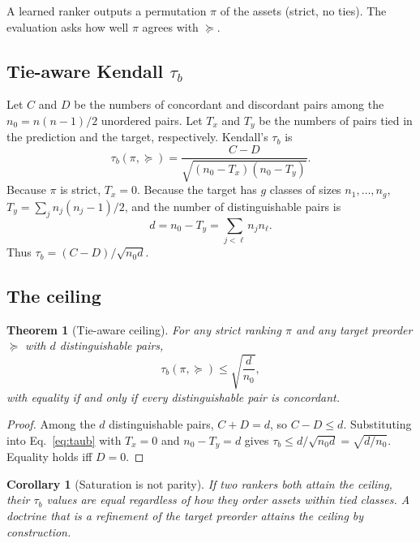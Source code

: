 \documentclass[conference,10pt]{IEEEtran}
\newtheorem{theorem}{Theorem}
\newtheorem{corollary}{Corollary}
\newcommand{\tb}{\tau_b}
\newcommand{\distinct}{d}
\newcommand{\nzero}{n_0}
\begin{document}
A learned ranker outputs a permutation $\pi$ of the assets (strict, no ties). The evaluation
asks how well $\pi$ agrees with $\succeq$.

\subsection{Tie-aware Kendall $\tb$}
Let $C$ and $D$ be the numbers of concordant and discordant pairs among the $\nzero=n(n-1)/2$
unordered pairs. Let $T_x$ and $T_y$ be the numbers of pairs tied in the prediction and the
target, respectively. Kendall's $\tb$ is
\begin{equation}
\tb(\pi,\succeq)=\frac{C-D}{\sqrt{(\nzero-T_x)(\nzero-T_y)}}.
\label{eq:taub}
\end{equation}
Because $\pi$ is strict, $T_x=0$. Because the target has $g$ classes of sizes $n_1,\dots,n_g$,
$T_y=\sum_j n_j(n_j-1)/2$, and the number of distinguishable pairs is
\begin{equation}
\distinct=\nzero-T_y=\sum_{j<\ell} n_j n_\ell .
\label{eq:d}
\end{equation}
Thus $\tb=(C-D)/\sqrt{\nzero\distinct}$.

\subsection{The ceiling}
\begin{theorem}[Tie-aware ceiling]
For any strict ranking $\pi$ and any target preorder $\succeq$ with $\distinct$ distinguishable
pairs,
\begin{equation}
\tb(\pi,\succeq)\le \sqrt{\frac{\distinct}{\nzero}},
\label{eq:ceiling}
\end{equation}
with equality if and only if every distinguishable pair is concordant.
\end{theorem}
\begin{proof}
Among the $\distinct$ distinguishable pairs, $C+D=\distinct$, so $C-D\le \distinct$.
Substituting into Eq.~\eqref{eq:taub} with $T_x=0$ and $\nzero-T_y=\distinct$ gives
$\tb\le \distinct/\sqrt{\nzero\distinct}=\sqrt{\distinct/\nzero}$. Equality holds iff $D=0$.
\end{proof}

\begin{corollary}[Saturation is not parity]
If two rankers both attain the ceiling, their $\tb$ values are equal regardless of how they
order assets within tied classes. A doctrine that is a refinement of the target preorder
attains the ceiling by construction.
\end{corollary}
\end{document}
